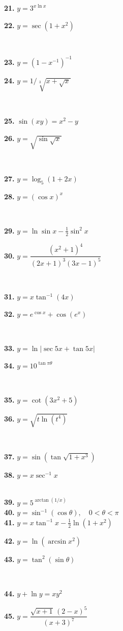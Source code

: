\begin{minipage}[t]{0.485\textwidth}
  \parbox[t]{0.48\linewidth}{\textbf{21.} $y = 3^{x \ln x}$}\hfill
  \parbox[t]{0.50\linewidth}{\textbf{22.} $y = \sec(1 + x^2)$}\\[5.5pt]
  \parbox[t]{0.48\linewidth}{\textbf{23.} $y = (1 - x^{-1})^{-1}$}\hfill
  \parbox[t]{0.50\linewidth}{\textbf{24.} $y = 1 / \sqrt[3]{x + \sqrt{x}}$}\\[5.5pt]
  \parbox[t]{0.48\linewidth}{\textbf{25.} $\sin(xy) = x^2 - y$}\hfill
  \parbox[t]{0.50\linewidth}{\textbf{26.} $y = \sqrt{\sin \sqrt{x}}$}\\[5.5pt]
  \parbox[t]{0.48\linewidth}{\textbf{27.} $y = \log_5(1 + 2x)$}\hfill
  \parbox[t]{0.50\linewidth}{\textbf{28.} $y = (\cos x)^x$}\\[5.5pt]
  \parbox[t]{0.48\linewidth}{\textbf{29.} $y = \ln \sin x - \frac{1}{2} \sin^2 x$}\hfill
  \parbox[t]{0.50\linewidth}{\textbf{30.} $y = \dfrac{(x^2 + 1)^4}{(2x + 1)^3(3x - 1)^5}$}\\[5.5pt]
  \parbox[t]{0.48\linewidth}{\textbf{31.} $y = x \tan^{-1}(4x)$}\hfill
  \parbox[t]{0.50\linewidth}{\textbf{32.} $y = e^{\cos x} + \cos(e^x)$}\\[5.5pt]
  \parbox[t]{0.48\linewidth}{\textbf{33.} $y = \ln|\sec 5x + \tan 5x|$}\hfill
  \parbox[t]{0.50\linewidth}{\textbf{34.} $y = 10^{\tan \pi\theta}$}\\[5.5pt]
  \parbox[t]{0.48\linewidth}{\textbf{35.} $y = \cot(3x^2 + 5)$}\hfill
  \parbox[t]{0.50\linewidth}{\textbf{36.} $y = \sqrt{t \ln(t^4)}$}\\[5.5pt]
  \parbox[t]{0.48\linewidth}{\textbf{37.} $y = \sin(\tan \sqrt{1 + x^3})$}\hfill
  \parbox[t]{0.50\linewidth}{\textbf{38.} $y = x \sec^{-1} x$}\\[5.5pt]
  \textbf{39.} $y = 5^{\arctan(1/x)}$\\[5.5pt]
  \textbf{40.} $y = \sin^{-1}(\cos\theta), \quad 0 < \theta < \pi$\\[5.5pt]
  \textbf{41.} $y = x \tan^{-1} x - \frac{1}{2}\ln(1 + x^2)$\\[5.5pt]
  \parbox[t]{0.48\linewidth}{\textbf{42.} $y = \ln(\arcsin x^2)$}\hfill
  \parbox[t]{0.50\linewidth}{\textbf{43.} $y = \tan^2(\sin\theta)$}\\[5.5pt]
  \parbox[t]{0.42\linewidth}{\textbf{44.} $y + \ln y = xy^2$}\hfill
  \parbox[t]{0.56\linewidth}{\textbf{45.} $y = \dfrac{\sqrt{x + 1}\,(2 - x)^5}{(x + 3)^7}$}
\end{minipage}%

